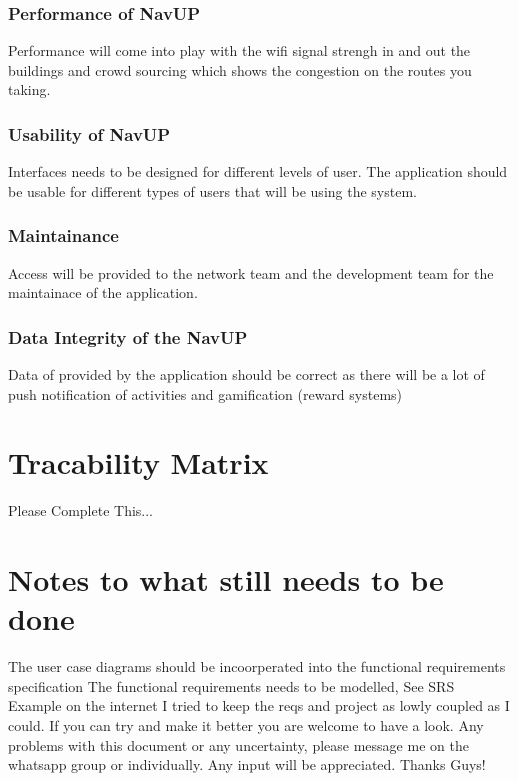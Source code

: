 \documentclass{article}
\begin{document}
\subsubsection{Performance of NavUP}
Performance will come into play with the wifi signal strengh in and out the buildings and crowd sourcing which shows the congestion on the routes you taking.
\subsubsection{Usability of NavUP}
Interfaces needs to be designed for different levels of user. The application should be usable for different types of users that will be using the system.
\subsubsection{Maintainance}
Access will be provided to the network team and the development team for the maintainace of the application.
\subsubsection{Data Integrity of the NavUP}
Data of provided by the application should be correct as there will be a lot of push notification of activities and gamification (reward systems)

\newpage
\centering
\section{Tracability Matrix}
 
Please Complete This...

\newpage
\centering


\section{Notes to what still needs to be done}
The user case diagrams should be incoorperated into the functional requirements specification
The functional requirements needs to be modelled, See SRS Example on the internet 
I tried to keep the reqs and project as lowly coupled as I could. If you can try and make it better you are welcome to have a look.
Any problems with this document or any uncertainty, please message me on the whatsapp group or individually.
Any input will be appreciated.
Thanks Guys!
\end{document}
